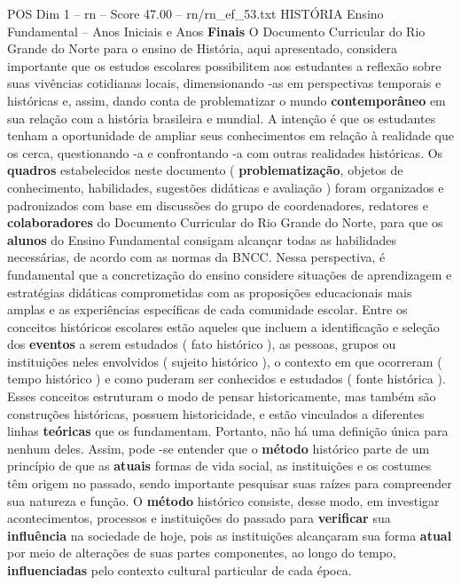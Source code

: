 \begin{textsample}{POS Dim 1 – rn – Score 47.00 – rn/rn\_ef\_53.txt}  \label{ex:f1_pos_264}
HISTÓRIA Ensino Fundamental – Anos Iniciais e Anos \textbf{Finais} O Documento Curricular do Rio Grande do Norte para o ensino de História, aqui apresentado, considera importante que os estudos escolares possibilitem aos estudantes a reflexão sobre suas vivências cotidianas locais, dimensionando -as em perspectivas temporais e históricas e, assim, dando conta de problematizar o mundo \textbf{contemporâneo} em sua relação com a história brasileira e mundial.
A intenção é que os estudantes tenham a oportunidade de ampliar seus conhecimentos em relação à realidade que os cerca, questionando -a e confrontando -a com outras realidades históricas.
Os \textbf{quadros} estabelecidos neste documento ( \textbf{problematização}, objetos de conhecimento, habilidades, sugestões didáticas e avaliação ) foram organizados e padronizados com base em discussões do grupo de coordenadores, redatores e \textbf{colaboradores} do Documento Curricular do Rio Grande do Norte, para que os \textbf{alunos} do Ensino Fundamental consigam alcançar todas as habilidades necessárias, de acordo com as normas da BNCC.
Nessa perspectiva, é fundamental que a concretização do ensino considere situações de aprendizagem e estratégias didáticas comprometidas com as proposições educacionais mais amplas e as experiências específicas de cada comunidade escolar.
Entre os conceitos históricos escolares estão aqueles que incluem a identificação e seleção dos \textbf{eventos} a serem estudados ( fato histórico ), as pessoas, grupos ou instituições neles envolvidos ( sujeito histórico ), o contexto em que ocorreram ( tempo histórico ) e como puderam ser conhecidos e estudados ( fonte histórica ).
Esses conceitos estruturam o modo de pensar historicamente, mas também são construções históricas, possuem historicidade, e estão vinculados a diferentes linhas \textbf{teóricas} que os fundamentam.
Portanto, não há uma definição única para nenhum deles.
Assim, pode -se entender que o \textbf{método} histórico parte de um princípio de que as \textbf{atuais} formas de vida social, as instituições e os costumes têm origem no passado, sendo importante pesquisar suas raízes para compreender sua natureza e função.
O \textbf{método} histórico consiste, desse modo, em investigar acontecimentos, processos e instituições do passado para \textbf{verificar} sua \textbf{influência} na sociedade de hoje, pois as instituições alcançaram sua forma \textbf{atual} por meio de alterações de suas partes componentes, ao longo do tempo, \textbf{influenciadas} pelo contexto cultural particular de cada época.

\end{textsample}
